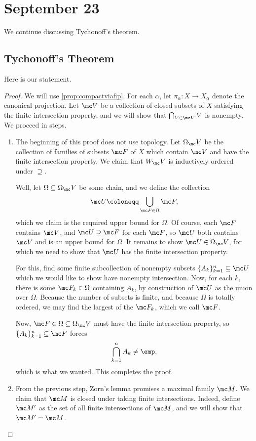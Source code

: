\documentclass[../notes.tex]{subfiles}
\begin{document}
\section{September 23}

We continue discussing Tychonoff's theorem.

\subsection{Tychonoff's Theorem}
Here is our statement.
\tychthm*
\begin{proof}
	We will use \autoref{prop:compactviafip}. For each $\alpha$, let $\pi_\alpha\colon X\to X_\alpha$ denote the canonical projection. Let $\mc V$ be a collection of closed subsets of $X$ satisfying the finite intersection property, and we will show that $\bigcap_{V\in\mc V}V$ is nonempty. We proceed in steps.
	\begin{enumerate}
		\item The beginning of this proof does not use topology. Let $\Omega_\mc V$ be the collection of families of subsets $\mc F$ of $X$ which contain $\mc V$ and have the finite intersection property. We claim that $W_\mc V$ is inductively ordered under $\supseteq$.

		Well, let $\Omega\subseteq\Omega_\mc V$ be some chain, and we define the collection
		\[\mc U\coloneqq\bigcup_{\mc F\in\Omega}\mc F,\]
		which we claim is the required upper bound for $\Omega$. Of course, each $\mc F$ contains $\mc V$, and $\mc U\supseteq\mc F$ for each $\mc F$, so $\mc U$ both contains $\mc V$ and is an upper bound for $\Omega$. It remains to show $\mc U\in\Omega_\mc V$, for which we need to show that $\mc U$ has the finite intersection property.
		
		For this, find some finite subcollection of nonempty subsets $\{A_k\}_{k=1}^n\subseteq\mc U$ which we would like to show have nonempty intersection. Now, for each $k$, there is some $\mc F_k\in\Omega$ containing $A_k$, by construction of $\mc U$ as the union over $\Omega$. Because the number of subsets is finite, and because $\Omega$ is totally ordered, we may find the largest of the $\mc F_k$, which we call $\mc F$.

		Now, $\mc F\in\Omega\subseteq\Omega_\mc V$ must have the finite intersection property, so $\{A_k\}_{k=1}^n\subseteq\mc F$ forces
		\[\bigcap_{k=1}^nA_k\ne\emp,\]
		which is what we wanted. This completes the proof.

		\item \label{item:mfip} From the previous step, Zorn's lemma promises a maximal family $\mc M$. We claim that $\mc M$ is closed under taking finite intersections. Indeed, define $\mc M'$ as the set of all finite intersections of $\mc M$, and we will show that $\mc M'=\mc M$.


\end{enumerate}
\end{proof}
\end{document}
